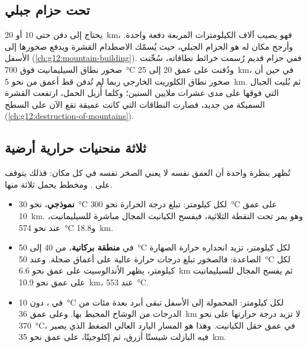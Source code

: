 \subsection{تحت حزام جبلي}

يحتاج  إلى دفن حتى 10 أو \qty{20}{km}، فهو يصيب
آلاف الكيلومترات المربعة دفعة واحدة. وأرجح مكان له هو 
الحزام الجبلي، حيث يُسمّك الاصطدام القشرة ويدفع صخورها إلى الأسفل
(\cref{ch:g12:mountain-building}). ففي حزام قديم رُسمت خرائط
نطاقاته، سُخّنت صخور نطاق السيليمانيت فوق
\qty{700}{\celsius} ودُفنت على عمق 20 إلى \qty{25}{km}، في حين أن صخور
نطاق الكلوريت الخارجي ربما لم تُدفن قط أعمق من نحو \qty{5}{km}.
ثم بُليت الجبال التي فوقها على مدى عشرات ملايين السنين؛ وكلما
أُزيل الحمل، ارتفعت القشرة السميكة من جديد، فصارت النطاقات التي كانت عميقة
تقع الآن على السطح (\cref{ch:g12:destruction-of-mountains}).

\subsection{ثلاثة منحنيات حرارية أرضية}

تُظهر  بنظرة واحدة أن العمق نفسه لا يعني الصخر
نفسه في كل مكان: فذلك يتوقف على . ومخطط 
يحمل ثلاثة منها.

\begin{itemize}
  \item {} \textbf{نموذجي}، نحو \qty{30}{\celsius} لكل
        كيلومتر: تبلغ درجة الحرارة نحو \qty{300}{\celsius} على عمق
        \qty{10}{km}. وهو يمر تحت النقطة الثلاثية، فيفسح الكيانيت
        المجال مباشرة للسيليمانيت، عند نحو \qty{574}{\celsius}
        و\qty{18.8}{km}.
  \item {} في \textbf{منطقة بركانية}، من 40 إلى \qty{50}{\celsius} لكل
        كيلومتر، تزيد انحداره حرارة الصهارة الصاعدة: فالصخور تبلغ
        درجات حرارة عالية على أعماق ضحلة. وعند \qty{50}{\celsius} لكل
        كيلومتر، يظهر الأندالوسيت على عمق نحو \qty{6.6}{km} ثم يفسح المجال
        للسيليمانيت على عمق نحو \qty{10.9}{km}، عند \qty{553}{\celsius}.
  \item {} في \textbf{}، دون
        \qty{10}{\celsius} لكل كيلومتر:  المحمولة إلى الأسفل
        تبقى أبرد بعدة مئات من الدرجات من الوشاح المحيط بها. وعلى
        عمق \qty{36}{km} لا تزيد درجة حرارتها على نحو \qty{370}{\celsius}، في عمق
        حقل الكيانيت. وهذا هو المسار البارد العالي الضغط الذي يصير فيه البازلت
        شيستًا أزرق، ثم إكلوجيتًا، على عمق نحو \qty{35}{km}.
\end{itemize}

